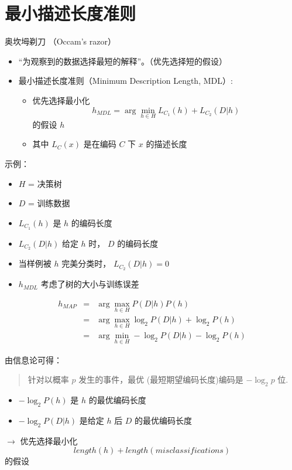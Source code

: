 \documentclass[presentation]{beamer}
\begin{document}
\section{最小描述长度准则}
\label{sec:org645f46a}
\begin{frame}[label={sec:orgca5bb52}]{奥坎坶剃刀 （Occam's razor）}
\begin{itemize}
\item “为观察到的数据选择最短的解释”。（优先选择短的假设）
\item 最小描述长度准则（Minimum Description Length, MDL）: 
\begin{itemize}
\item 优先选择最小化
$$h_{MDL} = \arg \min_{h \in H} L_{C_{1}}(h) + L_{C_{2}}(D|h)$$
的假设 \(h\)
\item 其中 \(L_{C}(x)\) 是在编码 \(C\) 下 \(x\) 的描述长度
\end{itemize}
\end{itemize}
\end{frame}

\begin{frame}[label={sec:orgbab7ce1}]{示例：}
\begin{itemize}
\item \(H\) = 决策树
\item \(D\) = 训练数据
\item \(L_{C_{1}}(h)\)  是 \(h\) 的编码长度
\item \(L_{C_{2}}(D|h)\) 给定 \(h\) 时， \(D\) 的编码长度
\item 当样例被 \(h\) 完美分类时， \(L_{C_{2}}(D|h)=0\)
\item \(h_{MDL}\) 考虑了树的大小与训练误差
\end{itemize}

\begin{eqnarray}
h_{MAP} &= &\arg \max_{h \in H}P(D|h) P(h) \nonumber \\
&= &\arg \max_{h \in H} \log_{2} P(D|h) + \log_{2} P(h)  \nonumber \\
&= &\arg \min_{h \in H} - \log_{2} P(D|h) - \log_{2} P(h) 
\end{eqnarray}
\end{frame}

\begin{frame}[label={sec:org81ac341}]{由信息论可得：}
\begin{quote}
针对以概率 $p$ 发生的事件，最优 (最短期望编码长度)编码是 $- \log_{2} p$ 位.
\end{quote}

\begin{itemize}
\item \(- \log_{2} P(h)\) 是 \(h\) 的最优编码长度
\item \(- \log_{2} P(D|h)\) 是给定 \(h\) 后 \(D\) 的最优编码长度
\end{itemize}

\(\rightarrow\) 优先选择最小化
$$length(h) + length(misclassifications)$$
的假设
\end{frame}
\end{document}
